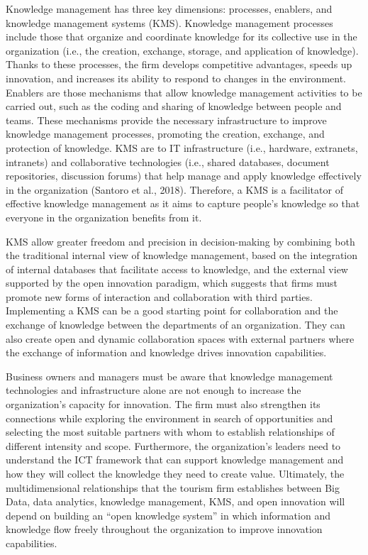 \documentclass[
  letterpaper,
  DIV=11,
  numbers=noendperiod]{scrreprt}
\begin{document}
Knowledge management has three key dimensions: processes, enablers, and
knowledge management systems (KMS). Knowledge management processes
include those that organize and coordinate knowledge for its collective
use in the organization (i.e., the creation, exchange, storage, and
application of knowledge). Thanks to these processes, the firm develops
competitive advantages, speeds up innovation, and increases its ability
to respond to changes in the environment. Enablers are those mechanisms
that allow knowledge management activities to be carried out, such as
the coding and sharing of knowledge between people and teams. These
mechanisms provide the necessary infrastructure to improve knowledge
management processes, promoting the creation, exchange, and protection
of knowledge. KMS are to IT infrastructure (i.e., hardware, extranets,
intranets) and collaborative technologies (i.e., shared databases,
document repositories, discussion forums) that help manage and apply
knowledge effectively in the organization (Santoro et al., 2018).
Therefore, a KMS is a facilitator of effective knowledge management as
it aims to capture people's knowledge so that everyone in the
organization benefits from it.

KMS allow greater freedom and precision in decision-making by combining
both the traditional internal view of knowledge management, based on the
integration of internal databases that facilitate access to knowledge,
and the external view supported by the open innovation paradigm, which
suggests that firms must promote new forms of interaction and
collaboration with third parties. Implementing a KMS can be a good
starting point for collaboration and the exchange of knowledge between
the departments of an organization. They can also create open and
dynamic collaboration spaces with external partners where the exchange
of information and knowledge drives innovation capabilities.

Business owners and managers must be aware that knowledge management
technologies and infrastructure alone are not enough to increase the
organization's capacity for innovation. The firm must also strengthen
its connections while exploring the environment in search of
opportunities and selecting the most suitable partners with whom to
establish relationships of different intensity and scope. Furthermore,
the organization's leaders need to understand the ICT framework that can
support knowledge management and how they will collect the knowledge
they need to create value. Ultimately, the multidimensional
relationships that the tourism firm establishes between Big Data, data
analytics, knowledge management, KMS, and open innovation will depend on
building an ``open knowledge system'' in which information and knowledge
flow freely throughout the organization to improve innovation
capabilities.
\end{document}
